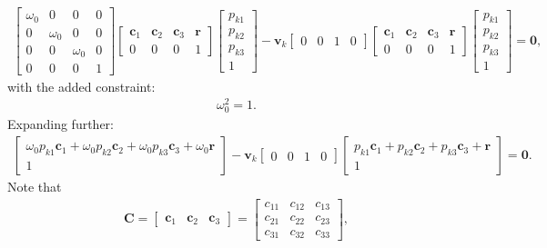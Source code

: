 \documentclass{article}
\begin{document}
\begin{align}
    \begin{bmatrix} \omega_0 & 0 & 0 & 0 \\ 0 & \omega_0 & 0 & 0 \\ 0 & 0 & \omega_0 & 0 \\ 0 & 0 & 0 & 1\end{bmatrix}\begin{bmatrix} \mathbf{c}_1 & \mathbf{c}_2 & \mathbf{c}_3 & \mathbf{r} \\ 0 & 0 & 0 & 1\end{bmatrix} \begin{bmatrix} p_{k1} \\ p_{k2} \\ p_{k3} \\ 1 \end{bmatrix} - \mathbf{v}_k \begin{bmatrix} 0 & 0 & 1 & 0 \end{bmatrix} \begin{bmatrix} \mathbf{c}_1 & \mathbf{c}_2 & \mathbf{c}_3 & \mathbf{r} \\ 0 & 0 & 0 & 1\end{bmatrix} \begin{bmatrix} p_{k1} \\ p_{k2} \\ p_{k3} \\ 1 \end{bmatrix} = \mathbf{0},
\end{align}
with the added constraint:
\begin{align}
    \omega_0^2 = 1.
\end{align}
Expanding further:
\begin{align}
    \begin{bmatrix}\omega_0 p_{k1} \mathbf{c}_1 + \omega_0 p_{k2} \mathbf{c}_2 + \omega_0 p_{k3} \mathbf{c}_3 + \omega_0 \mathbf{r} \\ 1\end{bmatrix} - \mathbf{v}_k \begin{bmatrix} 0 & 0 & 1 & 0 \end{bmatrix} \begin{bmatrix} p_{k1} \mathbf{c}_1 + p_{k2} \mathbf{c}_2 + p_{k3} \mathbf{c}_3 + \mathbf{r} \\ 1\end{bmatrix} = \mathbf{0}.
\end{align}
Note that
\begin{align}
    \mathbf{C} = \begin{bmatrix} \mathbf{c}_1 & \mathbf{c}_2 & \mathbf{c}_3\end{bmatrix} = \begin{bmatrix} c_{11} & c_{12} & c_{13} \\ c_{21} & c_{22} & c_{23} \\ c_{31} & c_{32} & c_{33} \end{bmatrix},
\end{align}
\end{document}
